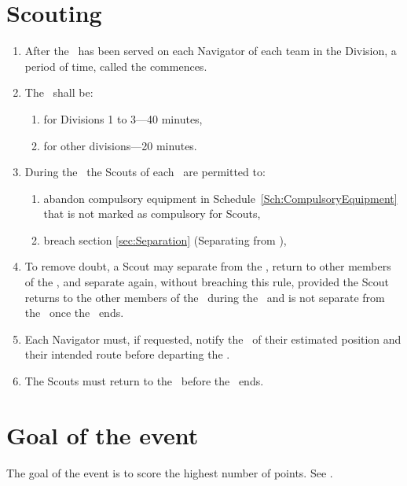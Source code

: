 \documentclass[12pt]{report}
\begin{document}
  \section{Scouting}
  \begin{enumerate}
    \item After the \TeamEnvelope\ has been served on each Navigator of each team in the Division, a period of time, called the  commences.
    \item The \scoutingperiod\ shall be:
    \begin{enumerate}
      \item for Divisions 1 to 3---40 minutes,
      \item for other divisions---20 minutes.
    \end{enumerate}
    \item During the \scoutingperiod\ the Scouts of each \team\ are permitted to:
    \begin{enumerate}
    \item abandon compulsory equipment in Schedule~\ref{Sch:CompulsoryEquipment} that is not marked as compulsory for Scouts,
    \item breach section \ref{sec:Separation} (Separating from \team),
    \end{enumerate}
    \item To remove doubt, a Scout may separate from the \team, return to other members of the \team, and separate again, without breaching this rule, provided the Scout returns to the other members of the \team\ during the \scoutingperiod\ and is not separate from the \team\ once the \scoutingperiod\ ends.
    \item Each Navigator must, if requested, notify the \LeadDriver\ of their estimated position and their intended route before departing the \dropoffpoint.
    \item The Scouts must return to the \dropoffpoint\ before the \scoutingperiod\ ends.
  \end{enumerate}
  \section{Goal of the event}
  \begin{fenumerate}
    \item The goal of the event is to score the highest number of points. See .
  \end{fenumerate}
\end{document}
